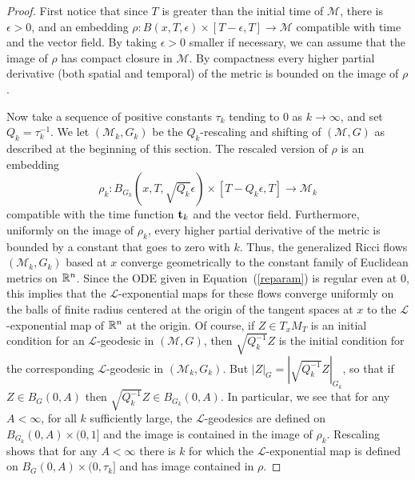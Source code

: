 \begin{proof}
\sketch
First notice that since $T$ is greater than the initial time of ${\mathcal M}$,
there is $\epsilon>0$, and an embedding $\rho\colon B(x,T,\epsilon)\times
[T-\epsilon,T]\to {\mathcal M}$ compatible with time  and the vector field. By
taking $\epsilon>0$ smaller if necessary, we can assume that the image of
$\rho$ has compact closure in ${\mathcal M}$. By compactness every higher
partial derivative (both spatial and temporal) of the metric is bounded on the
image of $\rho$.

Now take a sequence of positive constants $\tau_k$ tending to $0$ as
$k\rightarrow\infty$, and set $Q_k=\tau_k^{-1}$. We let $({\mathcal
M}_k,G_k)$ be the $Q_k$-rescaling and shifting of $({\mathcal M},G)$
as described at the beginning of this section. The rescaled version
of $\rho$ is an embedding
$$\rho_k\colon B_{G_k}(x,T,\sqrt{Q_k}\epsilon)\times [T-Q_k\epsilon,T]\to
{\mathcal M}_k$$ compatible with the time function ${\bf t}_k$ and the vector
field. Furthermore, uniformly on the image of $\rho_k$, every higher partial
derivative of the metric is bounded by a constant that goes to zero with $k$.
Thus, the generalized Ricci flows $({\mathcal M}_k,G_k)$ based at $x$ converge
geometrically to the constant family of Euclidean metrics on $\mathbb{R}^n$. Since the
ODE given in Equation~(\ref{reparam}) is regular even at $0$, this implies that
the ${\mathcal L}$-exponential maps for these flows converge uniformly on the
balls of finite radius centered at the origin of the tangent spaces at $x$ to
the ${\mathcal L}$-exponential map of $\mathbb{R}^n$ at the origin. Of course, if
$Z\in T_xM_T$ is an initial condition for an ${\mathcal L}$-geodesic in
$({\mathcal M},G)$, then $\sqrt{Q_k^{-1}}Z$ is the initial condition for the
corresponding ${\mathcal L}$-geodesic in $({\mathcal M}_k,G_k)$. But
$|Z|_G=|\sqrt{Q_k^{-1}}Z|_{G_k}$, so that if $Z\in B_G(0,A)$ then
$\sqrt{Q_k^{-1}}Z\in B_{G_k}(0,A)$.
 In particular, we see
that for any $A<\infty$, for all $k$ sufficiently large, the
${\mathcal L}$-geodesics are defined on $B_{G_k}(0,A)\times (0,1]$
and the image is contained in the image of $\rho_k$. Rescaling shows
that for any $A<\infty$  there is $k$ for which the ${\mathcal
L}$-exponential map is defined on $B_G(0,A)\times (0,\tau_k]$ and
has image contained in $\rho$.


\end{proof}
